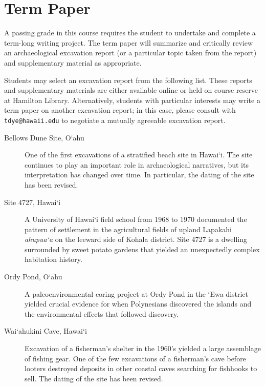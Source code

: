 \documentclass{scrartcl}
\begin{document}
\section{Term Paper}
\label{sec:orgb400994}
A passing grade in this course requires the student to undertake and complete a
term-long writing project. The term paper will summarize and critically review
an archaeological excavation report (or a particular topic taken from the report) and
supplementary material as appropriate.

Students may select an excavation report from the following list. These reports
and supplementary materials are either available online or held on course
reserve at Hamilton Library. Alternatively, students with particular interests
may write a term paper on another excavation report; in this case, please
consult with \texttt{tdye@hawaii.edu} to negotiate a mutually agreeable excavation
report.

\begin{description}
\item[{Bellows Dune Site, O`ahu}] One of the first excavations of a stratified
beach site in Hawai`i. The site continues to play an important role in
archaeological narratives, but its interpretation has changed over time.
In particular, the dating of the site has been revised.
\item[{Site 4727, Hawai`i}] A University of Hawai`i field school from 1968 to 1970
documented the pattern of settlement in the agricultural fields of upland
Lapakahi \emph{ahupua`a} on the leeward side of Kohala district. Site 4727 is
a dwelling surrounded by sweet potato gardens that yielded an
unexpectedly complex habitation history.
\end{description}

\begin{description}
\item[{Ordy Pond, O`ahu}] A paleoenvironmental coring project at Ordy Pond in the
`Ewa district yielded crucial evidence for when Polynesians discovered
the islands and the environmental effects that followed discovery.
\end{description}

\begin{description}
\item[{Wai`ahukini Cave, Hawai`i}] Excavation of a fisherman's shelter
in the 1960's yielded a large assemblage of fishing gear. One of the few excavations of a
fisherman's cave before looters destroyed deposits in other coastal caves
searching for fishhooks to sell. The dating of the site has been revised.
\end{description}
\end{document}

